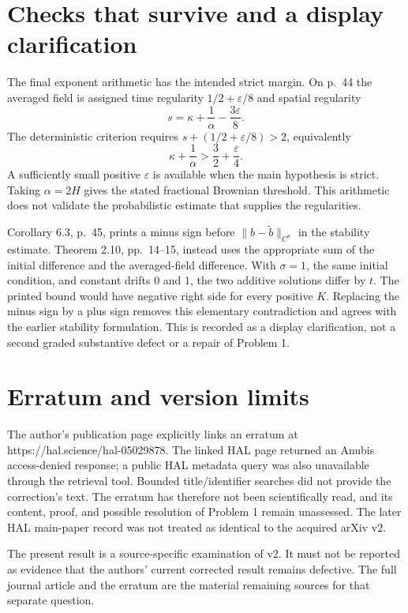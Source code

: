\documentclass[10pt]{article}
\begin{document}
\section*{Checks that survive and a display clarification}
The final exponent arithmetic has the intended strict margin. On p. 44 the averaged field is assigned time regularity \(1/2+\varepsilon/8\) and spatial regularity \[s=\kappa+\frac1\alpha-\frac{3\varepsilon}{8}.\] The deterministic criterion requires \(s+(1/2+\varepsilon/8)>2\), equivalently \[\kappa+\frac1\alpha>\frac32+\frac{\varepsilon}{4}.\] A sufficiently small positive \(\varepsilon\) is available when the main hypothesis is strict. Taking \(\alpha=2H\) gives the stated fractional Brownian threshold. This arithmetic does not validate the probabilistic estimate that supplies the regularities.\par
Corollary 6.3, p. 45, prints a minus sign before \(\|b-\widetilde b\|_{C^\kappa}\) in the stability estimate. Theorem 2.10, pp. 14–15, instead uses the appropriate sum of the initial difference and the averaged-field difference. With \(\sigma=1\), the same initial condition, and constant drifts \(0\) and \(1\), the two additive solutions differ by \(t\). The printed bound would have negative right side for every positive \(K\). Replacing the minus sign by a plus sign removes this elementary contradiction and agrees with the earlier stability formulation. This is recorded as a display clarification, not a second graded substantive defect or a repair of Problem 1.\par
\section*{Erratum and version limits}
The author’s publication page explicitly links an erratum at https://hal.science/hal-05029878. The linked HAL page returned an Anubis access-denied response; a public HAL metadata query was also unavailable through the retrieval tool. Bounded title/identifier searches did not provide the correction’s text. The erratum has therefore not been scientifically read, and its content, proof, and possible resolution of Problem 1 remain unassessed. The later HAL main-paper record was not treated as identical to the acquired arXiv v2.\par
The present result is a source-specific examination of v2. It must not be reported as evidence that the authors’ current corrected result remains defective. The full journal article and the erratum are the material remaining sources for that separate question.\par
\end{document}

